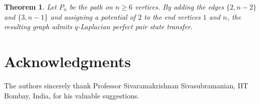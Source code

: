 \documentclass[12pt,a4paper]{article}
\newtheorem{thm}{Theorem}
\begin{document}
\begin{thm}
Let $P_n$ be the path on $n \geq 6$ vertices. By adding the edges $\{2,n-2\}$ and $\{3,n-1\}$ and assigning a potential of $2$ to the end vertices $1$ and $n$, the resulting graph admits $q$-Laplacian perfect pair state transfer.
\end{thm}
\section{Acknowledgments}
The authors sincerely thank Professor Sivaramakrishnan Sivasubramanian, IIT Bombay, India, for his valuable suggestions.




\end{document}
